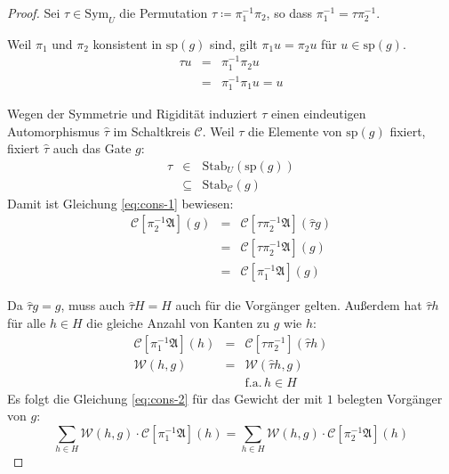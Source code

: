 \begin{proof}
Sei $\tau\in\mathrm{Sym}_{U}$ die Permutation $\tau\coloneqq\pi_{1}^{-1}\pi_{2}$,
so dass $\pi_{1}^{-1}=\tau\pi_{2}^{-1}$.

Weil $\pi_{1}$ und $\pi_{2}$ konsistent in $\mathrm{sp}\left(g\right)$
sind, gilt $\pi_{1}u=\pi_{2}u$ für $u\in\mathrm{sp}\left(g\right)$.
\begin{eqnarray*}
\tau u & = & \pi_{1}^{-1}\pi_{2}u\\
 & = & \pi_{1}^{-1}\pi_{1}u=u
\end{eqnarray*}

Wegen der Symmetrie und Rigidität induziert $\tau$ einen eindeutigen
Automorphismus $\hat{\tau}$ im Schaltkreis $\mathcal{C}$. Weil $\tau$
die Elemente von $\mathrm{sp}\left(g\right)$ fixiert, fixiert $\hat{\tau}$
auch das Gate $g$:
\begin{eqnarray*}
\tau & \in & \mathrm{Stab}_{U}\left(\mathrm{sp}\left(g\right)\right)\\
 & \subseteq & \mathrm{Stab}_{\mathcal{C}}\left(g\right)
\end{eqnarray*}
Damit ist Gleichung \ref{eq:cons-1} bewiesen:
\begin{eqnarray*}
\mathcal{C}\left[\pi_{2}^{-1}\mathfrak{A}\right]\left(g\right) & = & \mathcal{C}\left[\tau\pi_{2}^{-1}\mathfrak{A}\right]\left(\hat{\tau}g\right)\\
 & = & \mathcal{C}\left[\tau\pi_{2}^{-1}\mathfrak{A}\right]\left(g\right)\\
 & = & \mathcal{C}\left[\pi_{1}^{-1}\mathfrak{A}\right]\left(g\right)
\end{eqnarray*}

Da $\hat{\tau}g=g$, muss auch $\hat{\tau}H=H$ auch für die Vorgänger
gelten. Außerdem hat $\hat{\tau}h$ für alle $h\in H$ die gleiche
Anzahl von Kanten zu $g$ wie $h$:
\begin{eqnarray*}
\mathcal{C}\left[\pi_{1}^{-1}\mathfrak{A}\right]\left(h\right) & = & \mathcal{C}\left[\tau\pi_{2}^{-1}\right]\left(\hat{\tau}h\right)\\
\mathcal{W}\left(h,g\right) & = & \mathcal{W}\left(\hat{\tau}h,g\right)\\
 &  & \mathrm{f.a.}\,h\in H
\end{eqnarray*}
Es folgt die Gleichung \ref{eq:cons-2} für das Gewicht der mit $1$
belegten Vorgänger von $g$:
\[
\sum_{h\in H}\mathcal{W}\left(h,g\right)\cdot\mathcal{C}\left[\pi_{1}^{-1}\mathfrak{A}\right]\left(h\right)=\sum_{h\in H}\mathcal{W}\left(h,g\right)\cdot\mathcal{C}\left[\pi_{2}^{-1}\mathfrak{A}\right]\left(h\right)
\]
\end{proof}
